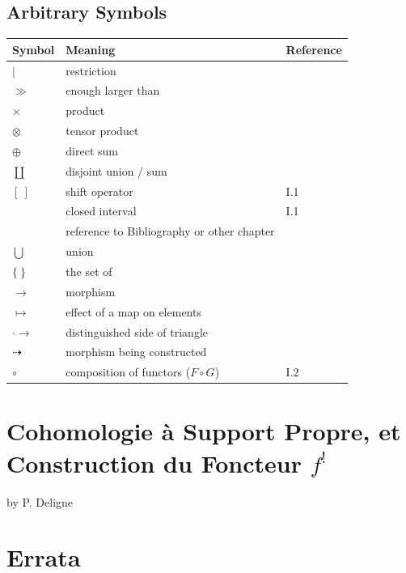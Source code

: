 \section*{Arbitrary Symbols}
\begin{longtable}{@{}l p{8cm} l@{}}
	\toprule
	Symbol & Meaning & Reference \\
	\midrule
	$\vert$ & restriction & \\
	$\gg$ & enough larger than & \\
	$\times$ & product & \\
	$\otimes$ & tensor product & \\
	$\oplus$ & direct sum & \\
	$\coprod$ & disjoint union / sum & \\
	$[\ ]$ & shift operator  & I.1 \\
	 & closed interval & I.1 \\
	&  reference to Bibliography or other chapter  & \\
	$\bigcup$ & union & \\
	$\{\ \}$ & the set of & \\
	$\to$ & morphism & \\
	$\mapsto$ & effect of a map on elements & \\
	$\cdot\to$ & distinguished side of triangle & \\
	$\dashrightarrow$ & morphism being constructed & \\
	$\circ$ & composition of functors ($F\circ G$) & I.2 \\
\end{longtable}
\nocite{*}
\printbibliography[title={Bibliography}]
\appendix
\chapter{Cohomologie à Support Propre, et Construction du Foncteur $f^!$}
by P. Deligne

\clearpage
{}
\chapter*{Errata}